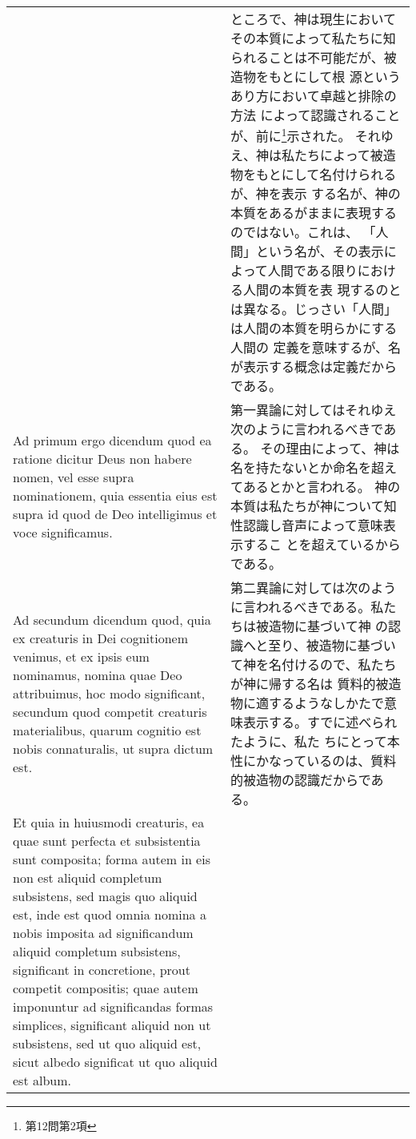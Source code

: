 \documentclass[10pt]{jsarticle} %
\begin{document}
\begin{longtable}{p{21em}p{21em}}
&

ところで、神は現生において
 その本質によって私たちに知られることは不可能だが、被造物をもとにして根
 源というあり方において卓越と排除の方法
 によって認識されることが、前に\footnote{第12問第2項}示された。
それゆえ、神は私たちによって被造物をもとにして名付けられるが、神を表示
 する名が、神の本質をあるがままに表現するのではない。これは、
「人間」という名が、その表示によって人間である限りにおける人間の本質を表
 現するのとは異なる。じっさい「人間」は人間の本質を明らかにする人間の
 定義を意味するが、名が表示する概念は定義だからである。



\\



{\sc Ad primum ergo dicendum} quod ea ratione dicitur Deus non
habere nomen, vel esse supra nominationem, quia essentia eius est supra
id quod de Deo intelligimus et voce significamus.

&

第一異論に対してはそれゆえ次のように言われるべきである。
その理由によって、神は名を持たないとか命名を超えてあるとかと言われる。
神の本質は私たちが神について知性認識し音声によって意味表示するこ
とを超えているからである。


\\

{\sc Ad secundum dicendum} quod, quia ex creaturis in Dei cognitionem
venimus, et ex ipsis eum nominamus, nomina quae Deo attribuimus, hoc
modo significant, secundum quod competit creaturis materialibus, quarum
cognitio est nobis connaturalis, ut supra dictum est. 

&

第二異論に対しては次のように言われるべきである。私たちは被造物に基づいて神
の認識へと至り、被造物に基づいて神を名付けるので、私たちが神に帰する名は
質料的被造物に適するようなしかたで意味表示する。すでに述べられたように、私た
ちにとって本性にかなっているのは、質料的被造物の認識だからである。

\\

Et quia in
huiusmodi creaturis, ea quae sunt perfecta et subsistentia sunt
composita; forma autem in eis non est aliquid completum subsistens, sed
magis quo aliquid est, inde est quod omnia nomina a nobis imposita ad
significandum aliquid completum subsistens, significant in concretione,
prout competit compositis; quae autem imponuntur ad significandas formas
simplices, significant aliquid non ut subsistens, sed ut quo aliquid
est, sicut albedo significat ut quo aliquid est album. 


\end{longtable}
\end{document}
